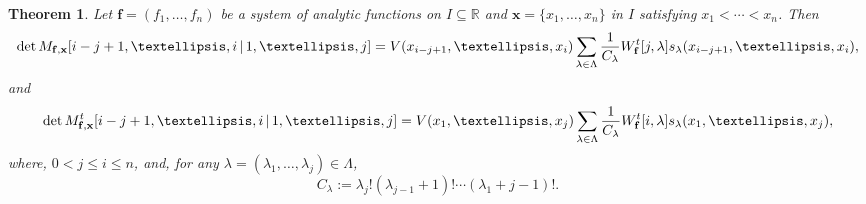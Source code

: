 \documentclass[10pt,a4paper]{amsart}
\newtheorem{theorem}{Theorem}
\begin{document}
\begin{theorem} \label{theo1}
Let  \( \mathbf{f} = (f_1, \ldots, f_n) \) be a system of analytic functions on \( I \subseteq \mathbb{R} \) and   \( \mathbf{x} = \{ x_1 , \ldots, x_n \} \) in \( I \) satisfying \( x_1 < \cdots < x_n \). Then 
\begin{equation}\label{MWT}
    \det M_{\bf f, \bf x}  {[i-j+1,\dots,i\,|\,1,\dots, j]}
 = V(x_{i-j+1},\dots,x_i)  \sum_{\lambda\in \Lambda}\frac{1}{C_\lambda}W^t_{{\bf f}}{[j,\lambda]}s_{\lambda}(x_{i-j+1},\dots,x_i),
\end{equation}
   and
   \begin{equation}\label{MWTt}
  \det M_{\bf f, \bf x}^t {[i-j+1,\dots,i\,|\,1,\dots, j]}
 = V(x_{1},\dots,x_j) \sum_{\lambda\in \Lambda}\frac{1}{C_\lambda}W^t_{{\bf f}}{[i,\lambda]}s_{\lambda}(x_{1},\dots,x_j),
\end{equation} 
where, $0 < j \leq i \leq n$, and,  for any $\lambda=(\lambda_1,\ldots,\lambda_j) \in \Lambda$,
\begin{equation}\label{eq:CLambda}
    C_\lambda:=\lambda_j!(\lambda_{j-1}+1)!\cdots (\lambda_1+j-1)!.
\end{equation}
     
\end{theorem}
\end{document}
